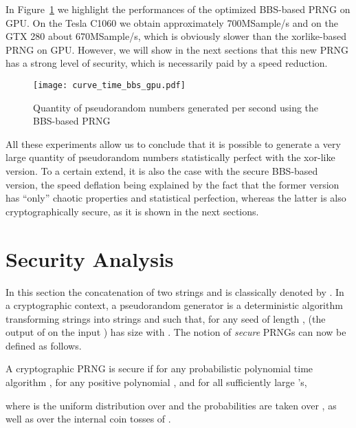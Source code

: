 \documentclass{article}
\begin{document}
In Figure~\ref{fig:time_bbs_gpu} we highlight  the performances of the optimized
BBS-based PRNG on GPU.  On  the Tesla C1060 we obtain approximately 700MSample/s
and  on the  GTX 280  about  670MSample/s, which  is obviously  slower than  the
xorlike-based PRNG on GPU. However, we  will show in the next sections that this
new PRNG  has a strong  level of  security, which is  necessarily paid by  a speed
reduction.

\begin{figure}[htbp]
\begin{center}
  \texttt{[image: curve\_time\_bbs\_gpu.pdf]}
\end{center}
\caption{Quantity of pseudorandom numbers generated per second using the BBS-based PRNG}
\label{fig:time_bbs_gpu}
\end{figure}

All  these  experiments allow  us  to conclude  that  it  is possible  to
generate a very large quantity of pseudorandom  numbers statistically perfect with the  xor-like version.
To a certain extend, it is also the case with the secure BBS-based version, the speed deflation being
explained by the fact that the former  version has ``only''
chaotic properties and statistical perfection, whereas the latter is also cryptographically secure,
as it is shown in the next sections.







\section{Security Analysis}
\label{sec:security analysis}



In this section the concatenation of two strings  and  is classically
denoted by .
In a cryptographic context, a pseudorandom generator is a deterministic
algorithm  transforming strings  into strings and such that, for any
seed  of length ,  (the output of  on the input ) has size
 with .
The notion of {\it secure} PRNGs can now be defined as follows. 

\begin{definition}
A cryptographic PRNG  is secure if for any probabilistic polynomial time
algorithm , for any positive polynomial , and for all sufficiently
large 's,

where  is the uniform distribution over  and the
probabilities are taken over ,  as well as over the
internal coin tosses of . 
\end{definition}
\end{document}
